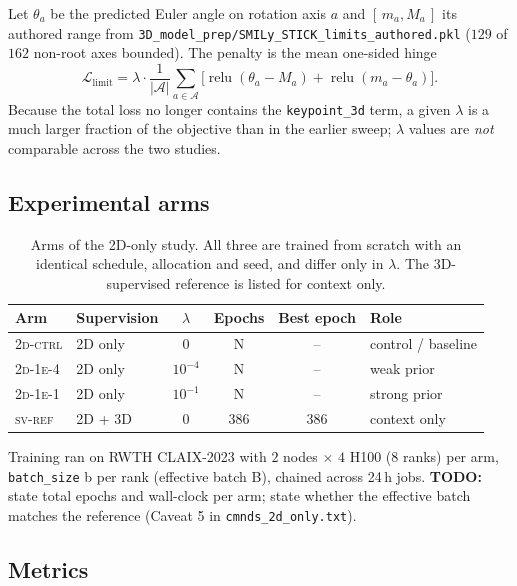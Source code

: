 \documentclass[11pt,a4paper]{article}
\newcommand{\lam}{\lambda}
\newcommand{\armctrl}{\textsc{2d-ctrl}}
\newcommand{\armref}{\textsc{sv-ref}}
\newcommand{\PH}[1]{#1}
\newcommand{\PH}[1]{\textcolor{red}{[#1]}}
\newcommand{\TBD}{\PH{--}}              %
\newcommand{\TODO}[1]{\PH{\textbf{TODO:} #1}}
\begin{document}
Let $\theta_{a}$ be the predicted Euler angle on rotation axis $a$ and
$[\,m_a, M_a\,]$ its authored range from
\texttt{3D\_model\_prep/SMILy\_STICK\_limits\_authored.pkl} ($129$ of $162$
non-root axes bounded). The penalty is the mean one-sided hinge
\begin{equation}
  \mathcal{L}_{\text{limit}}
  = \lam \cdot \frac{1}{|\mathcal{A}|}\sum_{a \in \mathcal{A}}
  \Big[\operatorname{relu}(\theta_a - M_a) + \operatorname{relu}(m_a - \theta_a)\Big].
  \label{eq:penalty}
\end{equation}
Because the total loss no longer contains the \texttt{keypoint\_3d} term, a given
$\lam$ is a much larger fraction of the objective than in the earlier sweep;
$\lam$ values are \emph{not} comparable across the two studies.

\subsection{Experimental arms}

\begin{table}[t]
\centering
\small
\caption{Arms of the 2D-only study. All three are trained from scratch with an
identical schedule, allocation and seed, and differ only in $\lam$. The
3D-supervised reference is listed for context only.}
\label{tab:arms}
\begin{tabular}{llcccl}
\toprule
Arm & Supervision & $\lam$ & Epochs & Best epoch & Role \\
\midrule
\armctrl{}       & 2D only & $0$       & \PH{N} & \TBD & control / baseline \\
\textsc{2d-1e-4} & 2D only & $10^{-4}$ & \PH{N} & \TBD & weak prior \\
\textsc{2d-1e-1} & 2D only & $10^{-1}$ & \PH{N} & \TBD & strong prior \\
\midrule
\armref{}        & 2D + 3D & $0$       & 386    & 386  & context only \\
\bottomrule
\end{tabular}
\end{table}

Training ran on RWTH CLAIX-2023 with $2$ nodes $\times$ $4$ H100 ($8$ ranks) per
arm, \texttt{batch\_size} \PH{b} per rank (effective batch \PH{B}), chained
across 24\,h jobs. \TODO{state total epochs and wall-clock per arm; state whether
the effective batch matches the reference (Caveat 5 in
\texttt{cmnds\_2d\_only.txt}).}

\subsection{Metrics}
\label{sec:metrics}
\end{document}
